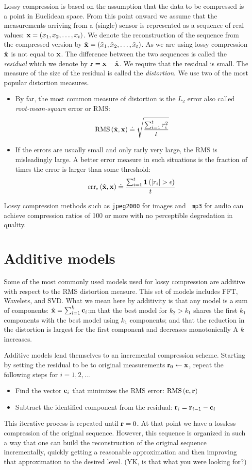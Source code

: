 Lossy compression is based on the assumption that the data to be
compressed is a point in Euclidean space. From this point onward we
assume that the measurements arriving from a (single) sensor is
represented as a sequence of real values: $\mathbf{x}=(x_1,x_2,\ldots,x_t)$.
We denote the reconstruction of the sequence from the compressed
version by $\hat{\mathbf{x}}=(\hat{x}_1,\hat{x}_2,\ldots,\hat{x}_t)$. As we are using lossy
compression $\hat{\mathbf{x}}$ is not equal to $\mathbf{x}$. The difference between the
two sequences is called the {\em residual} which we denote by $\mathbf{r} =
\mathbf{x} -\hat{\mathbf{x}}$.  We require that the residual is small. The measure of
the size of the residual is called the {\em distortion}. We use two of
the most popular distortion measures.
\begin{itemize}
\item By far, the most common measure of distortion is the $L_2$ error
  also called {\em root-mean-square} error or RMS:
\[
\mbox{RMS}\left(\hat{\mathbf{x}},\mathbf{x} \right)
\doteq \sqrt{\frac{\sum_{i=1}^t r_i^2}{t}}
\]
\item If the errors are usually small and only rarly very large,
the RMS is misleadingly large. A better error measure in such
situations is the fraction of times the error is larger
than some threshold:
\[
\mbox{err}_{\epsilon}\left(\vhx,\vx \right)
\doteq \frac{\sum_{i=1}^t \mathbf{1}\left(|r_i|>\epsilon \right)}{t}
\]
\end{itemize}
Lossy compression methods such as {\tt jpeg2000} for images and {\tt
  mp3} for audio can achieve compression ratios of 100 or more
with no perceptible degredation in quality.

\section{Additive models}
Some of the most commonly used models used for lossy compression are
additive with respect to the RMS distortion measure. This set of
models includes FFT, Wavelets, and SVD. What we mean here by
additivity is that any model is a sum of components: $\hat{\mathbf{x}} =
\sum_{i=1}^k \mathbf{c}_i$;m that the best model for $k_2>k_1$ shares the
first $k_1$ components with the best model using $k_1$ components; and
that the reduction in the distortion is largest for the first component
and decreases monotonically A $k$ increases.

Additive models lend themselves to an incremental compression
scheme. Starting by setting the residual to be to original
measurements $\mathbf{r}_0 \leftarrow \mathbf{x}$, repeat the following steps for
$i=1,2,\ldots$
\begin{itemize}
\item Find the vector $\mathbf{c}_i$ that minimizes the RMS error: 
$\mbox{RMS}\left(\mathbf{c},\mathbf{r} \right)$
\item Subtract the identified component from the residual: $\mathbf{r}_i =
  \mathbf{r}_{i-1}-\mathbf{c}_i$
\end{itemize}
This iterative process is repeated until $\mathbf{r}=0$. At that point we
have a lossless compression of the original sequence. However, this
sequence is organized in such a way that one can build the
reconstruction of the original sequence incrementally, quickly getting
a reasonable approximation and then improving that approximation to
the desired level. (YK, is that what you were looking for?)

